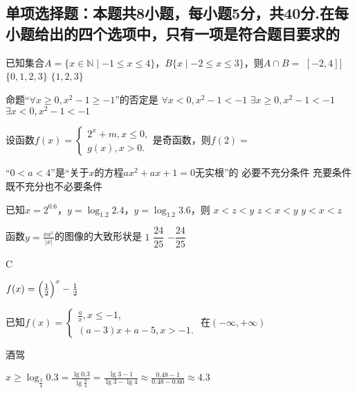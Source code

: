 \begin{exercise}
\section{单项选择题：本题共8小题，每小题5分，共40分.在每小题给出的四个选项中，只有一项是符合题目要求的}
  \item
    已知集合$A=\{x\in\mathbb{N}\mid -1\leq x \leq 4\}$，$B\{x\mid -2\leq x \leq 3\}$，则$A\cap B=$\xz
    \xx{$[-1,3]]$}
      {$[-2,4]]$}
      {$\{0,1,2,3\}$}
      {$\{1,2,3\}$}
    \begin{answer}
      
    \end{answer}
  \item
    命题“$\forall x\geq0,x^2-1\geq-1$”的否定是\xz
      {$\forall x<0,x^2-1<-1$}
      {$\exists x\geq0,x^2-1<-1$}
      {$\exists x<0,x^2-1<-1$}
    \begin{answer}
      
    \end{answer}
  \item
    设函数$f(x)=\begin{cases}
      2^x+m,x\leqslant0,\\
      g(x),x>0.
    \end{cases}$是奇函数，则$f(2)=$\xz
    \begin{answer}
      
    \end{answer}
  \item 
    “$0<a<4$”是“关于$x$的方程$ax^2+ax+1=0$无实根”的\xz
       {必要不充分条件}
       {充要条件}
       {既不充分也不必要条件}
    \begin{answer}
      
    \end{answer}
  \item
    已知$x=2^{0.6}$，$y=\log_{1.2}2.4$，$y=\log_{1.2}3.6$，则\xz
        {$x<z<y$}
        {$z<x<y$}
        {$y<x<z$}
    \begin{answer}
      
    \end{answer}
  \item
    函数$y=\tfrac{xa^x}{|x|}$的图像的大致形状是\xz
      \xx{\texttt{[image: ]}}
       {$1$}
       {$\dfrac{24}{25}$}
       {$-\dfrac{24}{25}$}
    \begin{answer}
      C
    \end{answer}
    \item
      $f(x)=\Bigl(\frac12\Bigr)^x-\frac12$
    \item
      已知$f(x)=\begin{cases}
        \frac{a}{x},x\leqslant-1,\\
        (a-3)x+a-5,x>-1.
      \end{cases}$ 在$(-\infty,+\infty)$
    \item
      酒驾
      \begin{answer}
        $x\geqslant\log_{\frac34}0.3=\frac{\lg0.3}{\lg\frac34}=\frac{\lg3-1}{\lg3-\lg4}\approx\frac{0.48-1}{0.48-0.60}\approx4.3$
      \end{answer}
   

\end{exercise}
